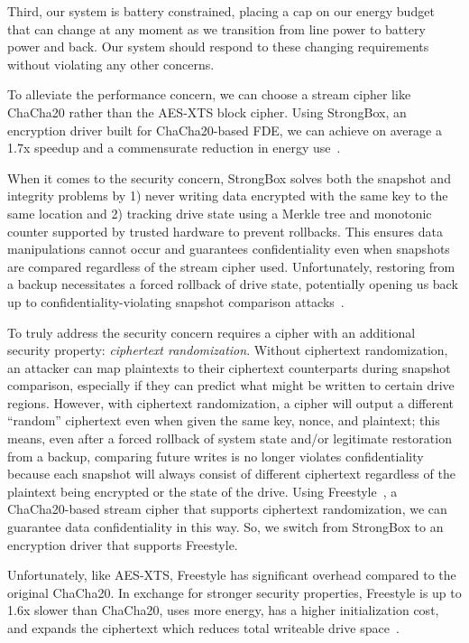 Third, our system is battery constrained, placing a cap on our energy
budget that can change at any moment as we transition from line power
to battery power and back. Our system should respond to these changing
requirements without violating any other concerns.

To alleviate the performance concern, we can choose a stream cipher like
ChaCha20 rather than the AES-XTS block cipher. Using StrongBox, an encryption
driver built for ChaCha20-based FDE, we can achieve on average a 1.7x speedup
and a commensurate reduction in energy use~\cite{StrongBox}.

When it comes to the security concern, StrongBox solves both the snapshot and
integrity problems by 1) never writing data encrypted with the same key to the
same location and 2) tracking drive state using a Merkle tree and monotonic
counter supported by trusted hardware to prevent rollbacks. This ensures data
manipulations cannot occur and guarantees confidentiality even when snapshots
are compared regardless of the stream cipher used. Unfortunately, restoring from
a backup necessitates a forced rollback of drive state, potentially opening us
back up to confidentiality-violating snapshot comparison
attacks~\cite{StrongBox}.

To truly address the security concern requires a cipher with an additional
security property: \emph{ciphertext randomization}. Without ciphertext
randomization, an attacker can map plaintexts to their ciphertext counterparts
during snapshot comparison, especially if they can predict what might be written
to certain drive regions. However, with ciphertext randomization, a cipher will
output a different ``random'' ciphertext even when given the same key, nonce,
and plaintext; this means, even after a forced rollback of system state and/or
legitimate restoration from a backup, comparing future writes is no longer
violates confidentiality because each snapshot will always consist of different
ciphertext regardless of the plaintext being encrypted or the state of the
drive. Using Freestyle~\cite{Freestyle}, a ChaCha20-based stream cipher that
supports ciphertext randomization, we can guarantee data confidentiality in this
way. So, we switch from StrongBox to an encryption driver that supports
Freestyle.

Unfortunately, like AES-XTS, Freestyle has significant overhead compared to the
original ChaCha20. In exchange for stronger security properties, Freestyle is up
to 1.6x slower than ChaCha20, uses more energy, has a higher initialization
cost, and expands the ciphertext which reduces total writeable drive
space~\cite{Freestyle}.

